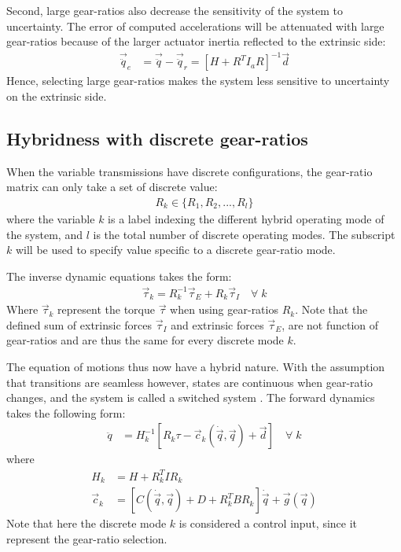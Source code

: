 Second, large gear-ratios also decrease the sensitivity of the system to uncertainty. The error of computed accelerations will be attenuated with large gear-ratios because of the larger actuator inertia reflected to the extrinsic side:
\begin{align}
	\vec{\ddot{q}}_e &= \vec{\ddot{q}} - \vec{\ddot{q}}_r = 
	\left[ 
    H + R^T I_a R
	\right]^{-1}
    \vec{d}
 \label{eq:sens}
\end{align}
%
Hence, selecting large gear-ratios makes the system less sensitive to uncertainty on the extrinsic side.

\subsection{Hybridness with discrete gear-ratios}
\label{sec:hyb}

When the variable transmissions have discrete configurations, the gear-ratio matrix can only take a set of discrete value:
%
\begin{align}
	R_k \in \{R_1,R_2, ... , R_l\} 
\end{align}
%
where the variable $k$ is a label indexing the different hybrid operating mode of the system, and $l$ is the total number of discrete operating modes. The subscript $k$ will be used to specify value specific to a discrete gear-ratio mode.

The inverse dynamic equations takes the form:
%
\begin{align}
	\vec{\tau}_k =  R_k^{-1} \vec{\tau}_E + R_k \vec{\tau}_I \quad\forall \; k
\end{align}
%
Where $\vec{\tau}_k$ represent the torque $\vec{\tau}$ when using gear-ratios $R_k$. Note that the defined sum of extrinsic forces $\vec{\tau}_I$ and extrinsic forces $\vec{\tau}_E$, are not function of gear-ratios and are thus the same for every discrete mode $k$. 

The equation of motions thus now have a hybrid nature. With the assumption that transitions are seamless however, states are continuous when gear-ratio changes, and the system is called a switched system \cite{liberzon_switching_2003}. The forward dynamics takes the following form:
%
\begin{align}
	\ddot{q}  &=  H_k^{-1} \left[ R_k \tau - \vec{c}_k( \dot{\vec{q}} , \vec{q} ) + \vec{d} \right] \quad\forall \; k 
\end{align}
%
where 
%
\begin{align}
	H_k       &=  H + R_k^T I R_k \\
	\vec{c}_k &=  \left[ C(\dot{\vec{q}} , \vec{q}) + D + R_k^T B R_k  \right] \dot{\vec{q}} + \vec{g}( \vec{q} ) 
\end{align}
%
Note that here the discrete mode $k$ is considered a control input, since it represent the gear-ratio selection.

